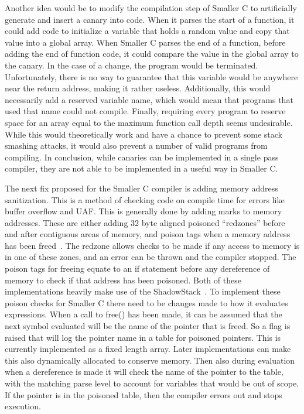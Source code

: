 \documentclass[sigconf, anonymous]{acmart}
\begin{document}
Another idea would be to modify the compilation step of Smaller C to artificially generate and insert a canary into code. When it parses the start of a function, it could add code to initialize a variable that holds a random value and copy that value into a global array. When Smaller C parses the end of a function, before adding the end of function code, it could compare the value in the global array to the canary. In the case of a change, the program would be terminated. Unfortunately, there is no way to guarantee that this variable would be anywhere near the return address, making it rather useless. Additionally, this would necessarily add a reserved variable name, which would mean that programs that used that name could not compile. Finally, requiring every program to reserve space for an array equal to the maximum function call depth seems undesirable. While this would theoretically work and have a chance to prevent some stack smashing attacks, it would also prevent a number of valid programs from compiling. In conclusion, while canaries can be implemented in a single pass compiler, they are not able to be implemented in a useful way in Smaller C.




The next fix proposed for the Smaller C compiler is adding memory address sanitization. This is a method of checking code on compile time for errors like buffer overflow and UAF. This is generally done by adding marks to memory addresses. These are either adding 32 byte aligned poisoned “redzones” before and after contiguous areas of memory, and poison tags when a memory address has been freed~\cite{AddressSanitizeWiki}. The redzone allows checks to be made if any access to memory is in one of these zones, and an error can be thrown and the compiler stopped. The poison tags for freeing equate to an if statement before any dereference of memory to check if that address has been poisoned. Both of these implementations heavily make use of the ShadowStack~\cite{Serebryany:AddressSanitize}. To implement these poison checks for Smaller C there need to be changes made to how it evaluates expressions. When a call to free() has been made, it can be assumed that the next symbol evaluated will be the name of the pointer that is freed. So a flag is raised that will log the pointer name in a table for poisoned pointers. This is currently implemented as a fixed length array. Later implementations can make this also dynamically allocated to conserve memory. Then also during evaluation when a dereference is made it will check the name of the pointer to the table, with the matching parse level to account for variables that would be out of scope. If the pointer is in the poisoned table, then the compiler errors out and stops execution.
\end{document}
